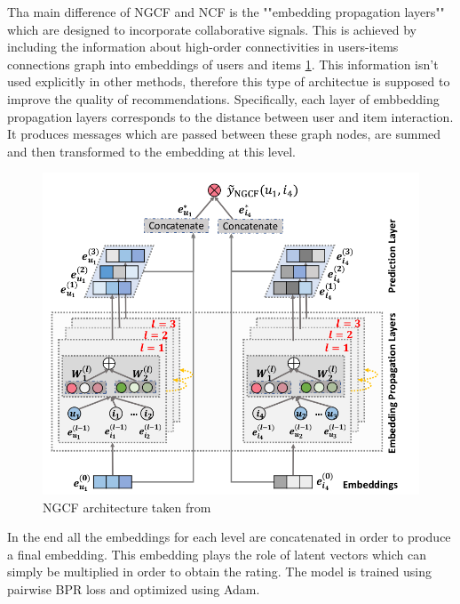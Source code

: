 
Tha main difference of NGCF \cite{wang2019neural} and NCF is the ""embedding propagation layers"" which are 
designed to incorporate collaborative signals.
This is achieved by including the information about high-order connectivities 
in users-items connections graph into embeddings of users and items \ref{fig:ngcf}.
This information isn't used explicitly in other methods, therefore this type 
of architectue is supposed to improve the quality of recommendations.
Specifically, each layer of embbedding propagation layers corresponds 
to the distance between user and item interaction. It produces messages which 
are passed between these graph nodes, are summed and then transformed to the 
embedding at this level.
\begin{figure}[h]
    \centering
    \includegraphics[width=0.8\linewidth]{images/ngcf.png}
    \caption{NGCF architecture taken from \cite{wang2019neural}}
    \label{fig:ngcf}
\end{figure}
In the end all the embeddings for each level are concatenated in order to produce a final embedding.
This embedding plays the role of latent vectors which can simply be multiplied in order to obtain the rating.
The model is trained using pairwise BPR loss and optimized using Adam.